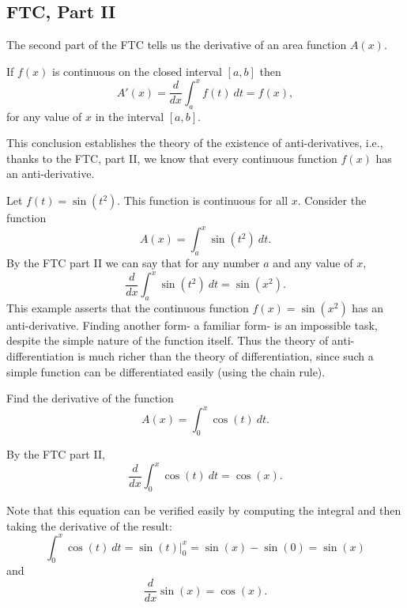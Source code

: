 \documentclass{ximera}
\begin{document}
\subsection{FTC, Part II}

The second part of the FTC tells us the derivative of an area function $A(x)$.  


\begin{theorem}
If $f(x)$ is continuous on the closed interval $[a, b]$ then 
\[A'(x) = \frac{d}{dx}\int_a^x f(t) \ dt = f(x), \]
for any value of $x$ in the interval $[a, b]$.
\end{theorem}

This conclusion establishes the theory of the existence of anti-derivatives, i.e., thanks to the FTC, part II, we know that every continuous function $f(x)$ has an anti-derivative. 




\begin{example}[example 2]
 Let $f(t) = \sin(t^2)$.  This function is continuous for all $x$.  Consider the function
\[A(x) = \int_a^x \sin(t^2) \ dt.\]
By the FTC part II
we can say that for any number $a$ and any value of $x$, 
\[\frac{d}{dx}\int_a^x \sin(t^2) \ dt = \sin(x^2).\]
This example asserts that the continuous function $f(x) = \sin(x^2)$ has an anti-derivative.  
Finding another form- a familiar form- is an impossible task, despite the simple nature of the function itself.  
Thus the theory of anti-differentiation is much richer than the theory of differentiation, 
since such a simple function can be differentiated easily (using the chain rule).
\end{example}


\begin{example}[example 3]
Find the derivative of the function
\[A(x) = \int_0^x \cos(t) \ dt.\]

By the FTC part II,
\[\frac{d}{dx}\int_0^x \cos(t) \ dt = \cos(x).\]
 
Note that this equation can be verified easily by computing the integral and then taking the derivative of the result:
\[\int_0^x \cos(t) \ dt = \sin(t) \Big|_0^x = \sin(x) - \sin(0) = \sin(x)\]
and 
\[\frac{d}{dx} \sin(x) = \cos(x).\]
\end{example}
\end{document}
